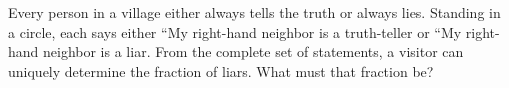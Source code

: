 Every person in a village either always tells the truth or always lies. Standing in a circle, each says either ``My right-hand neighbor is a truth-teller or ``My right-hand neighbor is a liar. From the complete set of statements, a visitor can uniquely determine the fraction of liars. What must that fraction be?

